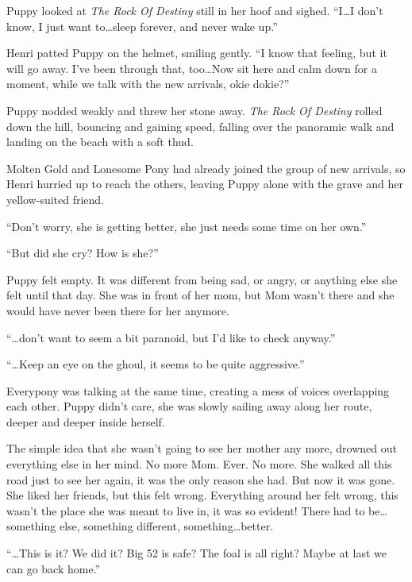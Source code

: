 Puppy looked at \emph{The Rock Of Destiny}\/ still in her hoof and sighed. ``I\dots I don't know, I just want to\dots sleep forever, and never wake up.''

Henri patted Puppy on the helmet, smiling gently. ``I know that feeling, but it will go away. I've been through that, too\dots Now sit here and calm down for a moment, while we talk with the new arrivals, okie dokie?''

Puppy nodded weakly and threw her stone away. \emph{The Rock Of Destiny}\/ rolled down the hill, bouncing and gaining speed, falling over the panoramic walk and landing on the beach with a soft thud.



\horizonline



Molten Gold and Lonesome Pony had already joined the group of new arrivals, so Henri hurried up to reach the others, leaving Puppy alone with the grave and her yellow-suited friend.

``Don't worry, she is getting better, she just needs some time on her own.''

``But did she cry? How is she?''

Puppy felt empty. It was different from being sad, or angry, or anything else she felt until that day. She was in front of her mom, but Mom wasn't there and she would have never been there for her anymore.

``\dots don't want to seem a bit paranoid, but I'd like to check anyway.''

``\dots Keep an eye on the ghoul, it seems to be quite aggressive.''

Everypony was talking at the same time, creating a mess of voices overlapping each other. Puppy didn't care, she was slowly sailing away along her route, deeper and deeper inside herself.

The simple idea that she wasn't going to see her mother any more, drowned out everything else in her mind. No more Mom. Ever. No more. She walked all this road just to see her again, it was the only reason she had. But now it was gone. She liked her friends, but this felt wrong. Everything around her felt wrong, this wasn't the place she was meant to live in, it was so evident! There had to be\dots something else, something different, something\dots better.

``\dots This is it? We did it? Big 52 is safe? The foal is all right? Maybe at last we can go back home.''

